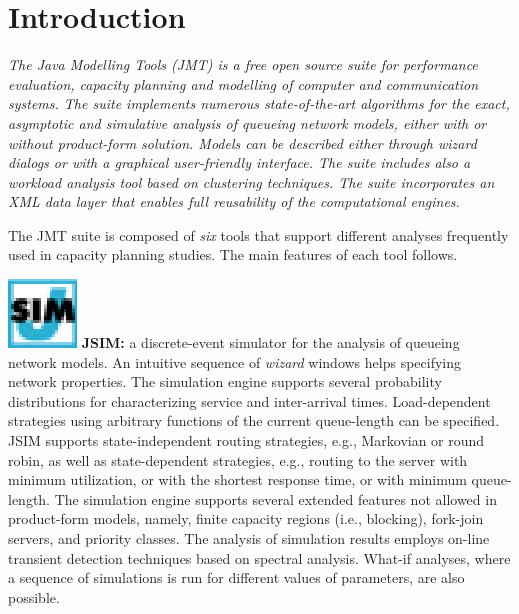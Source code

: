 %
%
%
%
%
\chapter{Introduction}
\emph{The Java Modelling Tools (JMT) is a free open source suite for
performance evaluation, capacity planning and modelling of computer
and communication systems. The suite implements numerous
state-of-the-art algorithms for the exact, asymptotic and simulative
analysis of queueing network models, either with or without
product-form solution. Models can be described either through wizard
dialogs or with a graphical user-friendly interface. The suite
includes also a workload analysis tool based on clustering
techniques. The suite incorporates an XML data layer that enables
full reusability of the computational engines.}

The JMT suite is composed of \emph{six} tools that support different
analyses frequently used in capacity planning studies. The main
features of each tool follows.

\medskip \noindent \includegraphics[scale=.5]{img/JSIMIcon}
\textbf{JSIM:} a discrete-event simulator for the analysis of queueing
network models. An intuitive sequence of \emph{wizard} windows helps
specifying network properties. The simulation engine supports
several probability distributions for characterizing service and
inter-arrival times. Load-dependent strategies using arbitrary
functions of the current queue-length can be specified. JSIM
supports state-independent routing strategies, e.g., Markovian or
round robin, as well as state-dependent strategies, e.g., routing to
the server with minimum utilization, or with the shortest response
time, or with minimum queue-length. The simulation engine supports
several extended features not allowed in product-form models,
namely, finite capacity regions (i.e., blocking), fork-join servers,
and priority classes. The analysis of simulation results employs
on-line transient detection techniques based on spectral analysis.
What-if analyses, where a sequence of simulations is run for
different values of parameters, are also possible.

